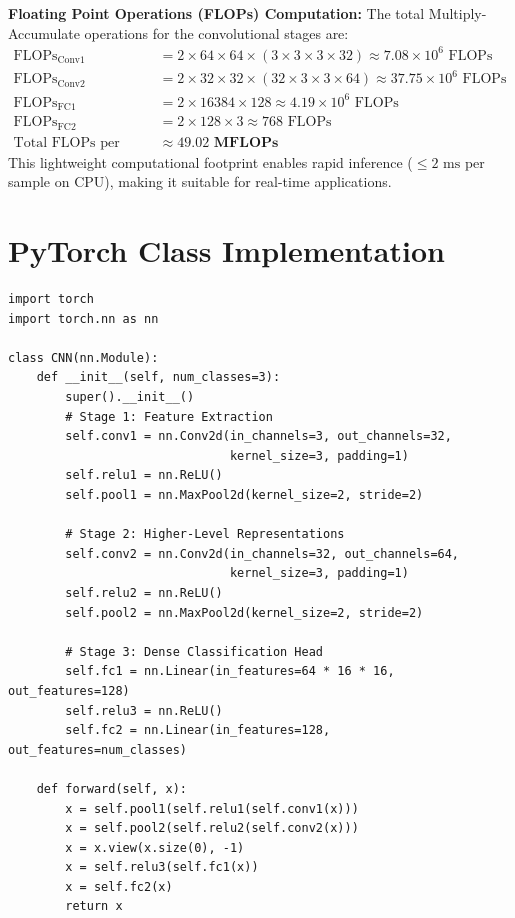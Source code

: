 \documentclass[11pt,a4paper,oneside]{report}
\begin{document}
\textbf{Floating Point Operations (FLOPs) Computation:}
The total Multiply-Accumulate operations for the convolutional stages are:
\begin{align}
    \text{FLOPs}_{\text{Conv1}} &= 2 \times 64 \times 64 \times (3 \times 3 \times 3 \times 32) \approx 7.08 \times 10^6 \text{ FLOPs} \\
    \text{FLOPs}_{\text{Conv2}} &= 2 \times 32 \times 32 \times (32 \times 3 \times 3 \times 64) \approx 37.75 \times 10^6 \text{ FLOPs} \\
    \text{FLOPs}_{\text{FC1}} &= 2 \times 16384 \times 128 \approx 4.19 \times 10^6 \text{ FLOPs} \\
    \text{FLOPs}_{\text{FC2}} &= 2 \times 128 \times 3 \approx 768 \text{ FLOPs} \\
    \text{Total FLOPs per Inference} &\approx \mathbf{49.02 \text{ MFLOPs}}
\end{align}
This lightweight computational footprint enables rapid inference ($\le 2\text{ ms}$ per sample on CPU), making it suitable for real-time applications.

\section{PyTorch Class Implementation}
\begin{lstlisting}[style=py, caption={PyTorch CNN Module Implementation.}]
import torch
import torch.nn as nn

class CNN(nn.Module):
    def __init__(self, num_classes=3):
        super().__init__()
        # Stage 1: Feature Extraction
        self.conv1 = nn.Conv2d(in_channels=3, out_channels=32, 
                               kernel_size=3, padding=1)
        self.relu1 = nn.ReLU()
        self.pool1 = nn.MaxPool2d(kernel_size=2, stride=2)
        
        # Stage 2: Higher-Level Representations
        self.conv2 = nn.Conv2d(in_channels=32, out_channels=64, 
                               kernel_size=3, padding=1)
        self.relu2 = nn.ReLU()
        self.pool2 = nn.MaxPool2d(kernel_size=2, stride=2)
        
        # Stage 3: Dense Classification Head
        self.fc1 = nn.Linear(in_features=64 * 16 * 16, out_features=128)
        self.relu3 = nn.ReLU()
        self.fc2 = nn.Linear(in_features=128, out_features=num_classes)

    def forward(self, x):
        x = self.pool1(self.relu1(self.conv1(x)))
        x = self.pool2(self.relu2(self.conv2(x)))
        x = x.view(x.size(0), -1)
        x = self.relu3(self.fc1(x))
        x = self.fc2(x)
        return x
\end{lstlisting}
\end{document}
